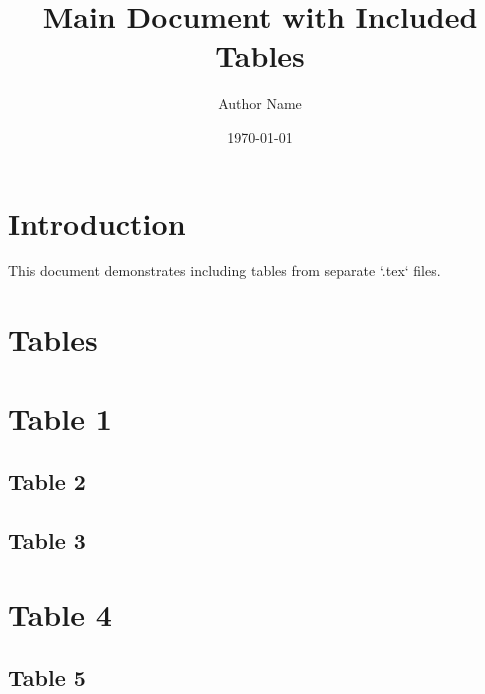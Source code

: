 \documentclass{article}
\title{Main Document with Included Tables}
\author{Author Name}
\date{\today}
\begin{document}
\maketitle

\section{Introduction}
This document demonstrates including tables from separate `.tex` files.



\section{Tables}

\newpage
\section{Table 1}


\begin{landscape} %
\newpage
\section{Table 2}

\end{landscape}
\restoregeometry


\begin{landscape} %
\newpage
\section{Table 3}

\end{landscape}
\restoregeometry



\section{Table 4}

\restoregeometry


\begin{landscape} 
\newpage
\section{Table 5}

\restoregeometry
\end{landscape} 
\end{document}
